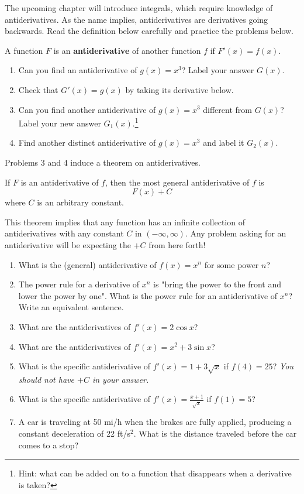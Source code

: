 \documentclass[letterpaper,11pt]{article}
\begin{document}
The upcoming chapter will introduce integrals, which require knowledge of antiderivatives. As the name implies, antiderivatives are derivatives going backwards. Read the definition below carefully and practice the problems below.
\begin{definition}
    A function $F$ is an \textbf{antiderivative} of another function $f$ if $F'(x) = f(x)$.
\end{definition}
\begin{enumerate}
\item Can you find an antiderivative of $g(x) = x^3$? Label your answer $G(x)$.
\vfill
\item Check that $G'(x) = g(x)$ by taking its derivative below.
\vfill
\item Can you find another antiderivative of $g(x) = x^3$ different from $G(x)$? Label your new answer $G_1(x)$.\footnote{Hint: what can be added on to a function that disappears when a derivative is taken?}
\vfill
\newpage
\item Find another distinct antiderivative of $g(x) = x^3$ and label it $G_2(x)$.
\vfill
\end{enumerate}
Problems 3 and 4 induce a theorem on antiderivatives.
\begin{theorem}
    If $F$ is an antiderivative of $f$, then the most general antiderivative of $f$ is
    \[F(x) + C\]
    where $C$ is an arbitrary constant.
\end{theorem}
This theorem implies that any function has an infinite collection of antiderivatives with any constant $C$ in $(-\infty,\infty)$. Any problem asking for an antiderivative will be expecting the $+C$ from here forth!
\vspace{.5in}
\begin{enumerate}[resume]
    \item What is the (general) antiderivative of $f(x) = x^n$ for some power $n$?
    \vfill
    \item The power rule for a derivative of $x^n$ is "bring the power to the front and lower the power by one". What is the power rule for an antiderivative of $x^n$? Write an equivalent sentence.
    \vfill
    \newpage
    \item What are the antiderivatives of $f'(x) = 2\cos{x}$?
    \vfill
    \item What are the antiderivatives of $f'(x) = x^2 + 3\sin{x}$?
    \vfill
    \item What is the specific antiderivative of $f'(x) = 1 + 3\sqrt{x}$ if $f(4) = 25$? \textit{You should not have $+C$ in your answer.}
    \vfill
    \newpage
    \item What is the specific antiderivative of $f'(x) = \frac{x+1}{\sqrt{x}}$ if $f(1) = 5$?
    \vfill
    \item A car is traveling at 50 mi/h when the brakes are fully applied, producing a constant deceleration of 22 ft/s$^2$. What is the distance traveled before the car comes to a stop?
    \vfill
\end{enumerate}
\end{document}
